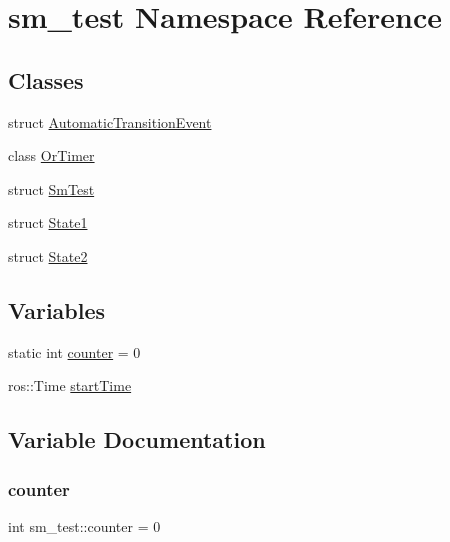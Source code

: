 \hypertarget{namespacesm__test}{}\section{sm\+\_\+test Namespace Reference}
\label{namespacesm__test}
\subsection*{Classes}
\begin{DoxyCompactItemize}
\item 
struct \hyperlink{structsm__test_1_1AutomaticTransitionEvent}{Automatic\+Transition\+Event}
\item 
class \hyperlink{classsm__test_1_1OrTimer}{Or\+Timer}
\item 
struct \hyperlink{structsm__test_1_1SmTest}{Sm\+Test}
\item 
struct \hyperlink{structsm__test_1_1State1}{State1}
\item 
struct \hyperlink{structsm__test_1_1State2}{State2}
\end{DoxyCompactItemize}
\subsection*{Variables}
\begin{DoxyCompactItemize}
\item 
static int \hyperlink{namespacesm__test_a1cae0029e5a72ff5017da7e71b3e4a00}{counter} = 0
\item 
ros\+::\+Time \hyperlink{namespacesm__test_aa99c742599f6e6c98f883ce4c03f743b}{start\+Time}
\end{DoxyCompactItemize}


\subsection{Variable Documentation}
\mbox{\label{namespacesm__test_a1cae0029e5a72ff5017da7e71b3e4a00}} 
\subsubsection{\texorpdfstring{counter}{counter}}
{\footnotesize\ttfamily int sm\+\_\+test\+::counter = 0\hspace{0.3cm}{\ttfamily [static]}}



